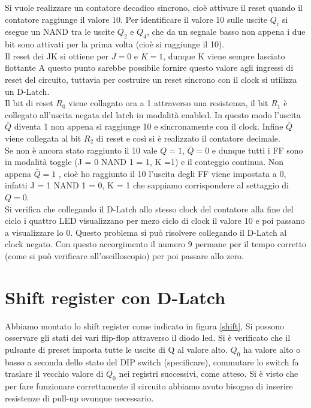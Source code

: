 \documentclass[10pt,a4paper]{article}
\begin{document}
Si vuole realizzare un contatore decadico sincrono, cioè attivare il reset quando il contatore raggiunge il valore 10. Per identificare il valore 10 sulle uscite $Q_i$ si esegue un NAND tra le uscite $Q_2$ e $Q_4$, che da un segnale basso non appena i due bit sono attivati per la prima volta (cioè si raggiunge il 10). \\
Il reset dei JK si ottiene per $J = 0$ e $K = 1$, dunque K viene sempre lasciato flottante
A questo punto sarebbe possibile fornire questo valore agli ingressi di reset del circuito, tuttavia per costruire un reset sincrono con il clock si utilizza un D-Latch.\\
Il bit di reset $R_0$ viene collagato ora a 1 attraverso una resistenza, il bit $R_1$ è collegato all'uscita negata del latch in modalità enabled. In questo modo l'uscita $\bar{Q}$ diventa 1 non appena si raggiunge 10 e sincronamente con il clock. Infine $\bar{Q}$ viene collegata al bit $R_2$ di reset e così si è realizzato il contatore decimale.\\
Se non è ancora stato raggiunto il 10 vale $Q = 1$, $\bar{Q} = 0$ e dunque tutti i FF sono in modalità toggle (J = 0 NAND 1 = 1, K =1) e il conteggio continua. Non appena $\bar{Q} = 1$ , cioè ho raggiunto il 10 l'uscita degli FF viene impostata a 0, infatti J = 1 NAND 1 = 0, K = 1 che sappiamo corrispondere al settaggio di $Q = 0$.\\

Si verifica che collegando il D-Latch allo stesso clock del contatore alla fine del ciclo i quattro LED visualizzano per mezo ciclo di clock il valore 10 e poi passano a visualizzare lo 0. Questo problema si può risolvere collegando il D-Latch al clock negato. Con questo accorgimento il numero 9 permane per il tempo corretto (come si può verificare all'oscilloscopio) per poi passare allo zero.\\
 

\section{Shift register con D-Latch}
Abbiamo montato lo shift register come indicato in figura \ref{shift}, Si possono osservare gli stati dei vari flip-flop attraverso il diodo led. Si è verificato che il pulsante di preset imposta tutte le uscite di Q al valore alto. $Q_0$ ha valore alto o basso a seconda dello stato del DIP switch (specificare), commutare lo switch fa traslare il vecchio valore di $Q_0$ nei registri successivi, come atteso. Si è visto che per fare funzionare correttamente il circuito abbiamo avuto bisogno di inserire resistenze di pull-up ovunque necessario.
\end{document}
